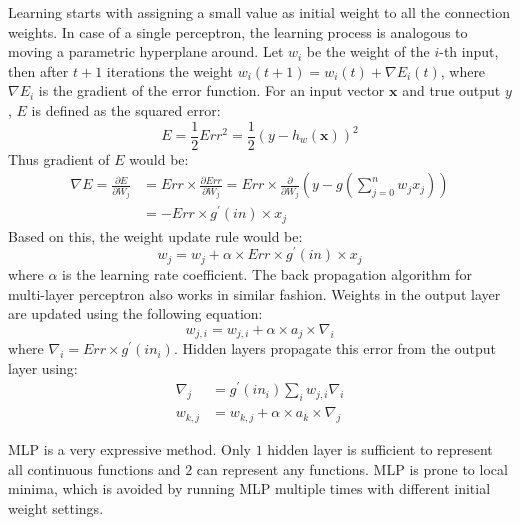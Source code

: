 Learning starts with assigning a small value as initial weight to all the connection weights. In case of a single perceptron, the learning process is analogous to moving a parametric hyperplane around. Let $w_i$ be the weight of the $i$-th input, then after $t+1$ iterations the weight $w_i(t+1) = w_i(t) + \nabla E_i(t)$, where $\nabla E_i$ is the gradient of the error function. For an input vector $\mathbf{x}$ and true output $y$, $E$ is defined as the squared error:
\[
E = \frac{1}{2} Err^2 = \frac{1}{2} (y - h_w(\mathbf{x}))^2
\]
Thus gradient of $E$ would be:
\begin{align*}
    \nabla E = \frac{\partial E}{\partial W_j} & = Err \times \frac{\partial Err}{\partial W_j} = Err \times \frac{\partial}{\partial W_j} (y - g(\sum_{j=0}^n w_j x_j)) \\
    & = - Err \times g^{\prime} (in) \times x_j
\end{align*}
Based on this, the weight update rule would be:
\[
w_j = w_j + \alpha \times Err \times g^{\prime} (in) \times x_j
\]
where $\alpha$ is the learning rate coefficient. The back propagation algorithm for multi-layer perceptron also works in similar fashion. Weights in the output layer are updated using the following equation:
\[
w_{j,i} = w_{j,i} + \alpha \times a_j \times \nabla_i
\]
where $\nabla_i = Err \times g^\prime(in_i)$. Hidden layers propagate this error from the output layer using:
\begin{align*}
    \nabla_j &= g^\prime (in_i) \sum_i w_{j,i} \nabla_i \\
    w_{k, j} &= w_{k, j} + \alpha \times a_k \times \nabla_j
\end{align*}

MLP is a very expressive method. Only $1$ hidden layer is sufficient to represent all continuous functions and $2$ can represent any functions. MLP is prone to local minima, which is avoided by running MLP multiple times with different initial weight settings.
\clearpage